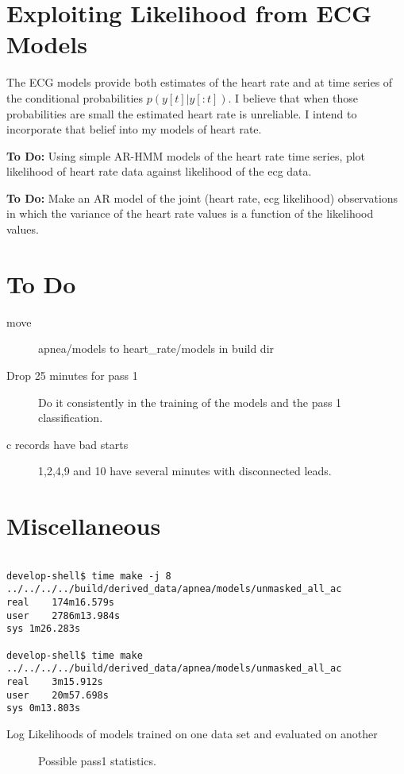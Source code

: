 \documentclass[12pt]{article}
\begin{document}
\section{Exploiting Likelihood from ECG Models}
\label{sec:exploit_likelihood}

The ECG models provide both estimates of the heart rate and at time
series of the conditional probabilities $p(y[t]|y[:t])$.  I believe
that when those probabilities are small the estimated heart rate is
unreliable.  I intend to incorporate that belief into my models of
heart rate.

\textbf{To Do:} Using simple AR-HMM models of the heart rate time
series, plot likelihood of heart rate data against likelihood of the
ecg data.

\textbf{To Do:}  Make an AR model of the joint (heart
rate, ecg likelihood) observations in which the variance of the heart
rate values is a function of the likelihood values.

\section{To Do}
\label{sec:todo}

\begin{description}
\item[move] apnea/models to heart\_rate/models in build dir
\item[Drop 25 minutes for pass 1] Do it consistently in the training
  of the models and the pass 1 classification.
\item[c records have bad starts] 1,2,4,9 and 10 have several minutes
  with disconnected leads.
\end{description}

\section{Miscellaneous}
\label{sec:misc}
\begin{verbatim}

develop-shell$ time make -j 8 ../../../../build/derived_data/apnea/models/unmasked_all_ac  
real	174m16.579s
user	2786m13.984s
sys	1m26.283s

develop-shell$ time make ../../../../build/derived_data/apnea/models/unmasked_all_ac
real	3m15.912s
user	20m57.698s
sys	0m13.803s

\end{verbatim}

\begin{table}
  \centering
   
  \caption[Log Likelihoods]{Log Likelihoods of models trained on one
    data set and evaluated on another}
  \label{tab:log_likelihoods}
\end{table}

\begin{figure}
  \centering
    \caption{Possible pass1 statistics.}
  \label{fig:statistics}
\end{figure}
\end{document}
